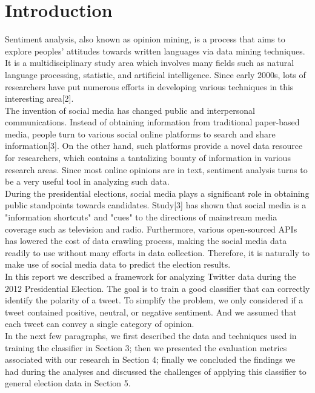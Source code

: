 \documentclass[paper=a4, fontsize=12pt]{scrartcl}
\numberwithin{equation}{section}
\numberwithin{figure}{section}
\numberwithin{table}{section}
\begin{document}
\section{Introduction}
\singlespacing
Sentiment analysis, also known as opinion mining, is a process that aims to explore peoples' attitudes towards written languages via data mining techniques. It is a multidisciplinary study area which involves many fields such as natural language processing, statistic, and artificial intelligence. Since early 2000s, lots of researchers have put numerous efforts in developing various techniques in this interesting area[2].\\[5pt]
The invention of social media has changed public and interpersonal communications. Instead of obtaining information from traditional paper-based media, people turn to various social online platforms to search and share information[3]. On the other hand, such platforms provide a novel data resource for researchers, which contains a tantalizing bounty of information in various research areas. Since most online opinions are in text, sentiment analysis turns to be a very useful tool in analyzing such data. \\[5pt]
During the presidential elections, social media plays a significant role in obtaining public standpoints towards candidates. Study[3] has shown that social media is a "information shortcuts" and "cues" to the directions of mainstream media coverage such as television and radio. Furthermore, various open-sourced APIs has lowered the cost of data crawling process, making the social media data readily to use without many efforts in data collection. Therefore, it is naturally to make use of social media data to predict the election results. \\[5pt]
In this report we described a framework for analyzing Twitter data during the 2012 Presidential Election. The goal is to train a good classifier that can correctly identify the polarity of a tweet. To simplify the problem, we only considered if a tweet contained positive, neutral, or negative sentiment. And we assumed that each tweet can convey a single category of opinion. \\[5pt]
In the next few paragraphs, we first described the data and techniques used in training the classifier in Section 3; then we presented the evaluation metrics associated with our research in Section 4; finally we concluded the findings we had during the analyses and discussed the challenges of applying this classifier to general election data in Section 5.
\end{document}
